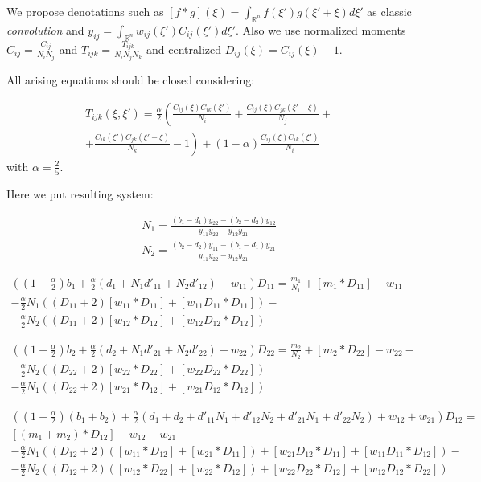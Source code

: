 \documentclass[%
 aip,
rsi,%
 amsmath,amssymb,
 reprint,%
]{revtex4-1}
\begin{document}
We propose denotations such as $[f*g](\xi)=\int_{\mathbb{\mathbb{R}}^{n}}f(\xi')g(\xi'+\xi)d\xi'$
as classic \emph{convolution }and $y_{ij}=\int_{\mathbb{\mathbb{R}}^{n}}w_{ij}(\xi')C_{ij}(\xi')d\xi'$.
Also we use normalized moments $C_{ij}=\frac{C_{ij}}{N_{i}N_{j}}$
and $T_{ijk}=\frac{T_{ijk}}{N_{i}N_{j}N_{k}}$ and centralized $D_{ij}(\xi)=C_{ij}(\xi)-1$.

All arising equations should be closed considering:

\begin{multline*}
T_{ijk}(\xi,\xi') = \frac{\alpha}{2}\left(\frac{C_{ij}(\xi)C_{ik}(\xi')}{N_{i}}+\frac{C_{ij}(\xi)C_{jk}(\xi'-\xi)}{N_{j}}+\right.\\
\left.+\frac{C_{ik}(\xi')C_{jk}(\xi'-\xi)}{N_{k}}-1\right)+(1-\alpha)\frac{C_{ij}(\xi)C_{ik}(\xi')}{N_{i}}
\end{multline*}
with $\alpha=\frac 2 5$.

Here we put resulting system:

\begin{eqnarray*}
	N_{1}=\frac{(b_{1}-d_{1})y_{22}-(b_{2}-d_{2})y_{12}}{y_{11}y_{22}-y_{12}y_{21}}
	\\
	N_{2}=\frac{(b_{2}-d_{2})y_{11}-(b_{1}-d_{1})y_{21}}{y_{11}y_{22}-y_{12}y_{21}}
\end{eqnarray*}
\begin{widetext}
	\begin{multline*}
	((1-\frac{\alpha}{2})b_{1}+\frac{\alpha}{2}(d_{1}+N_{1}d'_{11}+N_{2}d'_{12})+w_{11})D_{11}=\frac{m_{1}}{N_{1}}+\left[m_{1}*D_{11}\right]-w_{11}-\\
	-\frac{\alpha}{2}N_{1}((D_{11}+2)[w_{11}*D_{11}]+[w_{11}D_{11}*D_{11}])-\\
	-\frac{\alpha}{2}N_{2}((D_{11}+2)[w_{12}*D_{12}]+[w_{12}D_{12}*D_{12}])
	\end{multline*}

	\begin{multline*}
	((1-\frac{\alpha}{2})b_{2}+\frac{\alpha}{2}(d_{2}+N_{1}d'_{21}+N_{2}d'_{22})+w_{22})D_{22}=\frac{m_{2}}{N_{2}}+\left[m_{2}*D_{22}\right]-w_{22}-\\
	-\frac{\alpha}{2}N_{2}((D_{22}+2)[w_{22}*D_{22}]+[w_{22}D_{22}*D_{22}])-\\
	-\frac{\alpha}{2}N_{1}((D_{22}+2)[w_{21}*D_{12}]+[w_{21}D_{12}*D_{12}])
	\end{multline*}

	\begin{eqnarray*}
		((1-\frac{\alpha}{2})(b_{1}+b_{2})+\frac{\alpha}{2}(d_{1}+d_{2}+d'_{11}N_{1}+d'_{12}N_{2}+d'_{21}N_{1}+d'_{22}N_{2})+w_{12}+w_{21})D_{12}=\\{}
		[(m_{1}+m_{2})*D_{12}]-w_{12}-w_{21}-\\
		-\frac{\alpha}{2}N_{1}((D_{12}+2)([w_{11}*D_{12}]+[w_{21}*D_{11}])+[w_{21}D_{12}*D_{11}]+[w_{11}D_{11}*D_{12}])-\\
		-\frac{\alpha}{2}N_{2}((D_{12}+2)([w_{12}*D_{22}]+[w_{22}*D_{12}])+[w_{22}D_{22}*D_{12}]+[w_{12}D_{12}*D_{22}])
	\end{eqnarray*}
\end{widetext}
\end{document}
